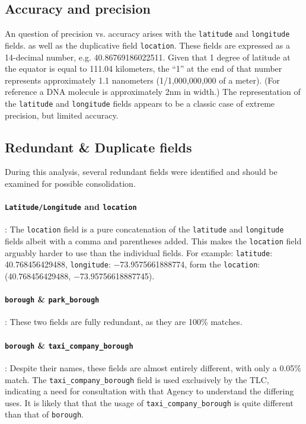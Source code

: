 \documentclass[linenumber]{jdsart}
\begin{document}
\subsection{Accuracy and precision}
\label{sec:precision}
An question of precision vs. accuracy arises with the \texttt{latitude} 
and \texttt{longitude} fields. as well as the duplicative 
field \texttt{location}. These fields are expressed as 
a 14\mbox{-}decimal number, e.g. 40.86769186022511. Given 
that 1 degree of latitude at the equator is equal to 111.04 
kilometers, the ``1'' at the end of that number represents 
approximately 1.1 nanometers (1/1,000,000,000 of a meter). (For 
reference a DNA molecule is approximately 2nm in width.) The 
representation of the \texttt{latitude} and \texttt{longitude} fields
appears to be a classic case of extreme precision, but limited accuracy. 


\subsection{Redundant \& Duplicate fields}
\label{sec:duplicates}
During this analysis, several redundant fields were identified and should 
be examined for possible consolidation.

\paragraph{\texttt{Latitude/Longitude} and \texttt{location}}: 
The \texttt{location} field is a pure concatenation of 
the \texttt{latitude} and \texttt{longitude} fields albeit with a 
comma and parentheses added. This makes the \texttt{location} field 
arguably harder to use than the individual fields. For example:  
\texttt{latitude}: 40.768456429488, \texttt{longitude}: $-$73.9575661888774, 
form the \texttt{location}: (40.768456429488, $-$73.95756618887745).

\paragraph{\texttt{borough} \& \texttt{park\_borough}}: These two fields are fully redundant, 
as they are 100\% matches.

\paragraph{\texttt{borough} \& \texttt{taxi\_company\_borough}}: Despite 
their names, these fields are almost entirely different, with only 
a 0.05\% match. The \texttt{taxi\_company\_borough} field is 
used exclusively by the TLC, indicating a need for consultation 
with that Agency to understand the differing uses. It is 
likely that that the usage of \texttt{taxi\_company\_borough} is 
quite different than that of \texttt{borough}. 
\end{document}
